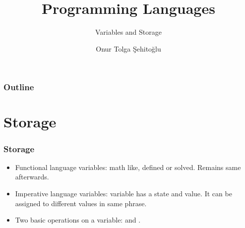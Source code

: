 \usepackage{etex}
\usepackage{tikz}
\usetikzlibrary{patterns,positioning,fit,arrows,matrix,calc,shapes.geometric,shapes.multipart,decorations.pathreplacing}
\usepackage[utf8]{inputenc}
\usepackage{listings}
\usepackage{multicol}

{
  \usepackage{fullpage}
  \usepackage{pgf}
  \usepackage{hyperref}
}

{

}


\title{Programming Languages}
\subtitle{Variables and Storage}
\author{Onur Tolga Şehitoğlu}
\subject{Variables and Storage}
\date{}
	\titlegraphic{\insertmetutitle\insertlicense}




%
%
%
%

 \frame[plain]{\maketitle}
 \begin{frame}
 \frametitle{Outline}
 \begin{multicols}{2}
 \small
 \tableofcontents
 \end{multicols}
 \end{frame}

\section{Storage}
\begin{frame}
\frametitle{Storage}
\begin{itemize}[<+->]
 \item Functional language  variables: math like, defined or solved. Remains same afterwards.
 \item Imperative language variables: variable has a state and value. It can be assigned to
 different values in same phrase.
 \item Two basic operations on a variable:  and .
\end{itemize}
\end{frame}

